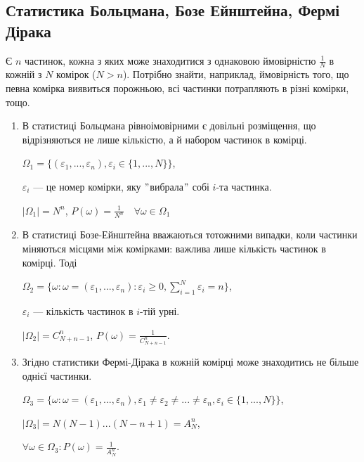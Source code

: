\subsection{Статистика Больцмана, Бозе Ейнштейна, Фермі Дірака}

\begin{problem}
    Є $n$ частинок, кожна з яких може знаходитися з однаковою ймовірністю
    $\frac{1}{N}$ в кожній з $N$ комірок ($N > n$). Потрібно
    знайти, наприклад, ймовірність того, що певна комірка виявиться порожньою,
    всі частинки потрапляють в різні комірки, тощо.
\end{problem}
\begin{enumerate}
    \item В статистиці Больцмана рівноімовірними є довільні розміщення, що
    відрізняються не лише кількістю, а й набором частинок в комірці.
    
    $\Omega_1 = \{(\varepsilon_1, ..., \varepsilon_n), \varepsilon_i \in \{1, ..., N\}\}$,
    
    $\varepsilon_i$ --- це номер комірки, яку $"$вибрала$"$ собі $i$-та частинка.
    
    $|\Omega_1| = N^n$, $P(\omega) = \frac{1}{N^n} \quad \forall \omega \in \Omega_1$
    
    \item В статистиці Бозе-Ейнштейна вважаються тотожними випадки, коли
    частинки міняються місцями між комірками: важлива лише кількість
    частинок в комірці. Тоді
    
    $\Omega_2 = \{ \omega: \omega = (\varepsilon_1, ..., \varepsilon_n): \varepsilon_i \geqslant 0,
    \sum\limits_{i=1}^N \varepsilon_i = n \}$,
    
    $\varepsilon_i$ --- кількість частинок в $i$-тій урні.
    
    $|\Omega_2| = C_{N+n-1}^n$, $P(\omega) = \frac{1}{C_{N+n-1}^n}$.
    
    \item Згідно статистики Фермі-Дірака в кожній комірці може знаходитись
    не більше однієї частинки.
    
    $\Omega_3 = \{ \omega: \omega = (\varepsilon_1, ..., \varepsilon_n),
    \varepsilon_1 \neq \varepsilon_2 \neq ... \neq \varepsilon_n,
    \varepsilon_i \in \{1, ..., N\}\}$,
    
    $|\Omega_3| = N(N-1)...(N-n+1) = A_N^n$,
    
    $\forall \omega \in \Omega_3: P(\omega) = \frac{1}{A_N^n}$.
\end{enumerate}

